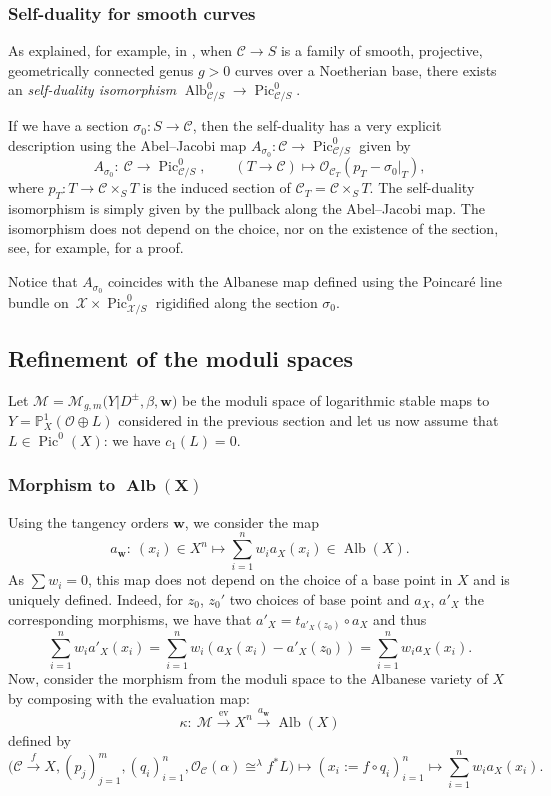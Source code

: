 \documentclass[11pt]{article}
\numberwithin{equation}{section}
\newcommand{\ev}{\mathrm{ev}}
\newcommand{\Pic}{\operatorname{Pic}}
\newcommand{\Alb}{\operatorname{Alb}}
\newcommand{\bfw}{ {\boldsymbol w} }
\newcommand{\M}{\mathcal{M}}
\newcommand{\X}{\mathcal{X}}
\newcommand{\C}{\mathcal{C}}
\renewcommand{\O}{\mathcal{O}}
\numberwithin{equation}{section}
\theoremstyle{definition}
\begin{document}
\subsubsection{Self-duality for smooth curves} As explained, for example, in \cite[Section~9.5.26]{fantechi2006fundamental}, when $\C\to S$ is a family of smooth, projective, geometrically connected genus $g>0$
curves over a Noetherian base, there exists an \emph{self-duality isomorphism}
$\Alb^0_{\C\slash S}\to \Pic^0_{\C\slash S}$.

 If we have a section $\sigma_0\colon S\to \C$, then the self-duality has a very explicit description using the Abel--Jacobi map $A_{\sigma_0}\colon\C\to\Pic^0_{\C/S}$ given by
\[
 A_{\mathcal \sigma_0}\colon \ \C \longrightarrow \Pic^0_{\C\slash S},\qquad
 (T\to\C) \longmapsto \mathcal O_{\C_T}(p_T -\sigma_0\rvert_T),
\]
where $p_T\colon T\to\C\times_S T$ is the induced section of $\C_T=\C\times_S T$.
The self-duality isomorphism is simply given by the pullback along the Abel--Jacobi map. The isomorphism does not depend on the choice, nor on the existence of the section, see, for example, \cite{esteves2002autoduality} for a proof.

Notice that $A_{\sigma_0}$ coincides with the Albanese map defined using the Poincar\'e line bundle on~${\X\times\Pic^0_{\X\slash S}}$ rigidified along the section $\sigma_0$.

\subsection{Refinement of the moduli spaces}

Let $\M=\M_{g,m}\bigl(Y|D^\pm,\beta,\bfw\bigr)$ be the moduli space of logarithmic stable maps to $Y=\mathbb P_X^1(\O\oplus L)$ considered in the previous section and let us now assume that $L\in\Pic^0(X)$: we have $c_1(L)=0$.


\subsubsection[Morphism to Alb(X)]{Morphism to $\boldsymbol{\operatorname{Alb}(X)}$}
Using the tangency orders $\bfw$, we consider the map
\[ a_\bfw\colon \ (x_i)\in X^n\longmapsto\sum_{i=1}^n w_i a_X(x_i)\in\Alb(X). \]
As $\sum w_i=0$, this map does not depend on the choice of a base point in $X$ and is uniquely defined. Indeed, for $z_0$, $z_0'$ two choices of base point and $a_X$, $a'_X$ the corresponding morphisms, we have that $a'_X= t_{a'_X(z_0)}\circ a_X$ and thus
\[
 \sum_{i=1}^n w_i a'_X(x_i)= \sum_{i=1}^n w_i (a_X(x_i) -a'_X(z_0))= \sum_{i=1}^n w_i a_X(x_i).
\]
Now, consider the morphism from the moduli space to the Albanese variety of $X$ by composing with the evaluation map:
\[ \kappa\colon\ \M\xrightarrow{\ev} X^n\xrightarrow{a_\bfw} \Alb(X)\]
defined by
\[%
\bigl(\C\xrightarrow{f} X,(p_j)_{j=1}^m,(q_i)_{i=1}^n,\O_{\C}(\alpha)\cong^{\lambda} f^*L\bigr)\mapsto (x_i:=f\circ q_i)_{i=1}^n\mapsto \sum_{i=1}^n w_i a_X(x_i).
\]
\end{document}
